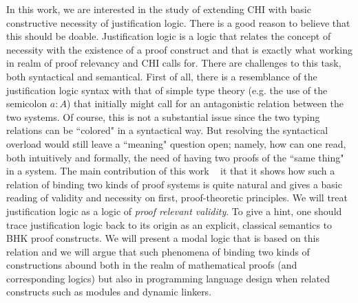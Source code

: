 In this work, we are interested in the study of  extending  \acrfull{CHI} with basic 
constructive  necessity of justification logic. 
There is a good reason to believe that this should be doable. Justification logic
 is a logic that relates the concept of necessity with the existence of a proof construct
  and that is exactly what working in  realm of proof relevancy and \ac{CHI} calls for. 
  There are challenges to this task, both syntactical and  semantical. First of all, there
   is a resemblance of the justification logic syntax with that of simple type theory 
   (e.g. the use of the semicolon $a:A$) that  initially might call for an antagonistic relation
    between the two systems. Of course, this is not a substantial issue since the two
     typing relations can be ``colored" in a syntactical way. 
     But resolving the syntactical overload would still leave a  ``meaning" question open;
      namely, how can one read, both intuitively and formally, the need of having two
       proofs of the ``same thing" in a system. 
       The main contribution of this work  
       ~\cite{Pouliasis2016} it that it  shows how such a relation of binding two kinds of
        proof systems is quite natural and gives a basic reading of validity and necessity 
        on first, proof-theoretic principles.  
        We will treat justification logic as a logic of \textit{proof relevant validity}.
         To give a hint, one should trace justification logic back to its 
         origin as an explicit, classical semantics to \ac{BHK} proof constructs. 
         We will present a modal logic that is based on this relation and we will argue
          that such phenomena of binding two kinds of constructions abound both
           in the realm  of mathematical proofs (and corresponding logics) 
           but also in programming language design when related constructs 
           such as modules and dynamic linkers.

